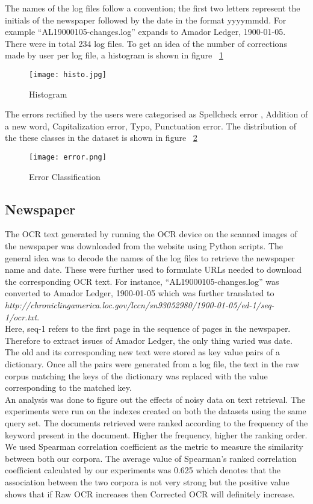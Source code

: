 \documentclass[letterpaper]{article}
\def\mydoubleq#1{``#1''}
\begin{document}
The names of the log files follow a convention; the first two letters represent the initials of the newspaper followed by the date in the format yyyymmdd. For example \mydoubleq{AL19000105-changes.log} expands to Amador Ledger, 1900-01-05. There were in total 234 log files. To get an idea of the number of corrections made by user per log file, a histogram is shown in figure ~\ref{fig:histogram}

\begin{figure}[ht!]
\centering
\texttt{[image: histo.jpg]}
\caption{Histogram}
\label{fig:histogram}
\end{figure}

The errors rectified by the users were categorised as Spellcheck error , Addition of a new word, Capitalization error, Typo, Punctuation error. The distribution of the these classes in the dataset is shown in figure ~\ref{fig:stats}


\begin{figure}[h]
\centering
\texttt{[image: error.png]}
\caption{Error Classification}
\label{fig:stats}
\end{figure}

\subsection{Newspaper}
The OCR text generated by running the OCR device on the scanned images of the newspaper was downloaded from the website using Python scripts. The general idea was to decode the names of the log files to retrieve the newspaper name and date. These were further used to formulate URLs needed to download the corresponding OCR text. For instance, \mydoubleq{AL19000105-changes.log} was converted to Amador Ledger, 1900-01-05 which was further translated to \textit{http://chroniclingamerica.loc.gov/lccn/sn93052980/1900-01-05/ed-1/seq-1/ocr.txt}.\\
Here, seq-1 refers to the first page in the sequence of pages in the newspaper. Therefore to extract issues of Amador Ledger, the only thing varied was date.
The old and its corresponding new text were stored as key value pairs of a dictionary. Once all the pairs were generated from a log file, the text in the raw corpus matching the keys of the dictionary was replaced with the value corresponding to the matched key.\\
An analysis was done to figure out the effects of noisy data on text retrieval. The experiments were run on the indexes created on both the datasets using the same query set. The documents retrieved were ranked according to the frequency of the keyword present in the document. Higher the frequency, higher the ranking order. We used Spearman correlation coefficient as the metric to measure the similarity between both our corpora. The average value of Spearman's ranked correlation coefficient calculated by our experiments was 0.625 which denotes that the association between the two corpora is not very strong but the positive value shows that if Raw OCR increases then Corrected OCR will definitely increase.\\
\end{document}
